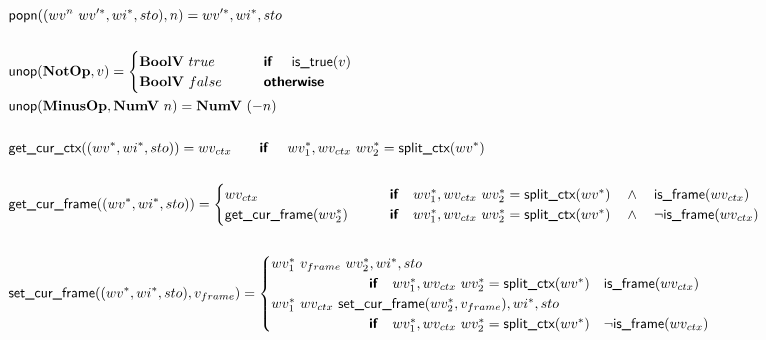 \begin{align*}
%
\newline \\
  &\popn((wv^n ~ \seq{wv'}, \seq{wi}, sto), n) = \seq{wv'}, \seq{wi}, sto \\
%
\newline \\
  &\unop(\notop, v) =
    \begin{cases}
      \boolv ~ true &\quad\quad\premise{if}\quad ~ \istrue(v) \\
      \boolv ~ false &\quad\quad\premise{otherwise} \\
    \end{cases}
  \\
  &\unop(\minusop, \numv ~ n) = \numv ~ (-n) \\
%
\newline \\
  &\getcurctx((\seq{wv}, \seq{wi}, sto)) =
  wv_{ctx} \quad\quad\premise{if}\quad ~ \seq{wv_1}, wv_{ctx} ~ \seq{wv_2} = \splitctx(\seq{wv}) \\
%
\newline \\
  &\getcurframe((\seq{wv}, \seq{wi}, sto)) =
    \begin{cases}
      wv_{ctx} &\quad\quad\premise{if}\quad
      \seq{wv_1}, wv_{ctx} ~ \seq{wv_2} = \splitctx(\seq{wv}) \quad\land\quad \isframe(wv_{ctx})\\
      \getcurframe(\seq{wv_2}) &\quad\quad\premise{if}\quad
      \seq{wv_1}, wv_{ctx} ~ \seq{wv_2} = \splitctx(\seq{wv}) \quad\land\quad \neg \isframe(wv_{ctx}) \\
    \end{cases}
  \\
%
\newline \\
  &\setcurframe((\seq{wv}, \seq{wi}, sto), v_{frame})
  =
  \begin{cases}
    \seq{wv_1} ~ v_{frame} ~ \seq{wv_2}, \seq{wi}, sto \\
    \qquad\qquad\qquad\quad\premise{if}\quad
    \seq{wv_1}, wv_{ctx} ~ \seq{wv_2} = \splitctx(\seq{wv}) \quad \isframe(wv_{ctx}) \\
    \seq{wv_1} ~ wv_{ctx} ~ \setcurframe(\seq{wv_2}, v_{frame}), \seq{wi}, sto \\
    \qquad\qquad\qquad\quad\premise{if}\quad
    \seq{wv_1}, wv_{ctx} ~ \seq{wv_2} = \splitctx(\seq{wv}) \quad \neg \isframe(wv_{ctx}) \\
  \end{cases}

\end{align*}
